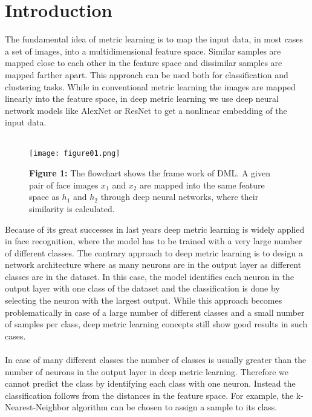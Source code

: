 \documentclass[12pt,paper=a4]{scrartcl}
\theoremstyle{break}
\begin{document}
\section{Introduction}
The fundamental idea of metric learning is to map the input data, in most cases a set of images, into a multidimensional feature space. Similar samples are mapped close to each other in the feature space and dissimilar samples are mapped farther apart. This approach can be used both for classification and clustering tasks. While in conventional metric learning the images are mapped linearly into the feature space, in deep metric learning we use deep neural network models like AlexNet or ResNet to get a nonlinear embedding of the input data. \\ \\
\begin{figure}[h]
	\centering
  \texttt{[image: figure01.png]}
  \caption{\textbf{Figure 1:} The flowchart shows the frame work of DML. A given pair of face images $x_1$ and $x_2$ are mapped into the same feature space as $h_1$ and $h_2$ through deep neural networks, where their similarity is calculated.}
\end{figure}
Because of its great successes in last years deep metric learning is widely applied in face recognition, where the model has to be trained with a very large number of different classes. The contrary approach to deep metric learning is to design a network architecture where as many neurons are in the output layer as different classes are in the dataset. In this case, the model identifies each neuron in the output layer with one class of the dataset and the classification is done by selecting the neuron with the largest output. While this approach becomes problematically in case of a large number of different classes and a small number of samples per class, deep metric learning concepts still show good results in such cases. \\ \\
In case of many different classes the number of classes is usually greater than the number of neurons in the output layer in deep metric learning. Therefore we cannot predict the class by identifying each class with one neuron. Instead the classification follows from the distances in the feature space. For example, the k-Nearest-Neighbor algorithm can be chosen to assign a sample to its class. \\ \\
\end{document}
